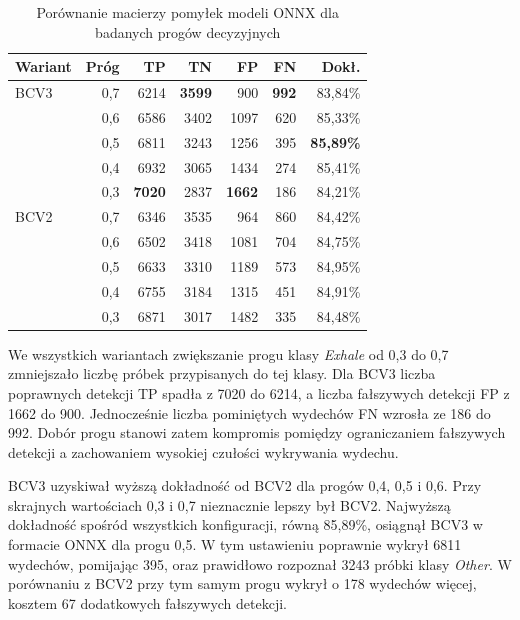 \begin{table}[htbp]
    \centering
    \caption{Porównanie macierzy pomyłek modeli ONNX dla badanych progów decyzyjnych}
    \label{tab:all_confusion_matrices}
    \scriptsize
    \setlength{\tabcolsep}{4pt}
    \renewcommand{\arraystretch}{1.08}
    \begin{tabular}{@{}lrrrrrr@{}}
        \toprule
        \textbf{Wariant} & \textbf{Próg} & \textbf{TP} & \textbf{TN} & \textbf{FP} & \textbf{FN} & \textbf{Dokł.} \\
        \midrule
        BCV3 & 0,7 & 6214 & \textbf{3599} & 900 & \textbf{992} & 83,84\% \\
        & 0,6 & 6586 & 3402 & 1097 & 620 & 85,33\% \\
        & 0,5 & 6811 & 3243 & 1256 & 395 & \textbf{85,89\%} \\
        & 0,4 & 6932 & 3065 & 1434 & 274 & 85,41\% \\
        & 0,3 & \textbf{7020} & 2837 & \textbf{1662} & 186 & 84,21\% \\
        \midrule
        BCV2 & 0,7 & 6346 & 3535 & 964 & 860 & 84,42\% \\
        & 0,6 & 6502 & 3418 & 1081 & 704 & 84,75\% \\
        & 0,5 & 6633 & 3310 & 1189 & 573 & 84,95\% \\
        & 0,4 & 6755 & 3184 & 1315 & 451 & 84,91\% \\
        & 0,3 & 6871 & 3017 & 1482 & 335 & 84,48\% \\
        \bottomrule
    \end{tabular}
\end{table}

We wszystkich wariantach zwiększanie progu klasy \textit{Exhale} od 0,3 do 0,7 zmniejszało liczbę próbek przypisanych do tej klasy. Dla BCV3 liczba poprawnych detekcji TP spadła z 7020 do 6214, a liczba fałszywych detekcji FP z 1662 do 900. Jednocześnie liczba pominiętych wydechów FN wzrosła ze 186 do 992. Dobór progu stanowi zatem kompromis pomiędzy ograniczaniem fałszywych detekcji a zachowaniem wysokiej czułości wykrywania wydechu.

BCV3 uzyskiwał wyższą dokładność od BCV2 dla progów 0,4, 0,5 i 0,6. Przy skrajnych wartościach 0,3 i 0,7 nieznacznie lepszy był BCV2. Najwyższą dokładność spośród wszystkich konfiguracji, równą 85,89\%, osiągnął BCV3 w formacie ONNX dla progu 0,5. W tym ustawieniu poprawnie wykrył 6811 wydechów, pomijając 395, oraz prawidłowo rozpoznał 3243 próbki klasy \textit{Other}. W porównaniu z BCV2 przy tym samym progu wykrył o 178 wydechów więcej, kosztem 67 dodatkowych fałszywych detekcji.

